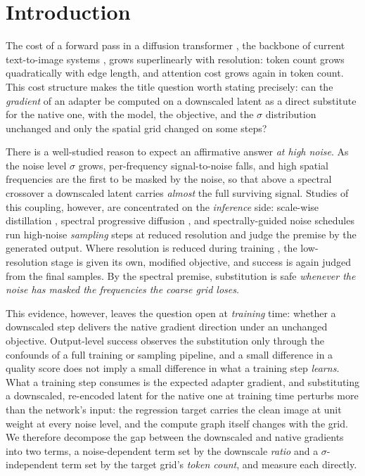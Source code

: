 \section{Introduction}
\label{sec:intro}

The cost of a forward pass in a diffusion transformer
\citep{peebles2023dit}, the backbone of current text-to-image
systems \citep{esser2024scaling,chen2024pixartalpha}, grows
superlinearly with resolution: token count grows quadratically with
edge length, and attention cost grows again in token count. This
cost structure makes the title question worth stating precisely: can
the \emph{gradient} of an adapter be computed on a downscaled latent
as a direct substitute for the native one, with the model, the
objective, and the $\sigma$ distribution unchanged and only
the spatial grid changed on some steps?

There is a well-studied reason to expect an affirmative answer
\emph{at high noise}. As the
noise level $\sigma$ grows, per-frequency signal-to-noise falls, and
high spatial frequencies are the first to be masked by the noise, so
that above a spectral crossover a downscaled latent carries
\emph{almost} the full surviving signal. Studies of this coupling, however, are
concentrated on the \emph{inference} side: scale-wise
distillation \citep{starodubcev2025swd}, spectral progressive
diffusion \citep{xiao2026spd}, and spectrally-guided noise schedules
\citep{esteves2026spectral} run high-noise \emph{sampling} steps at
reduced resolution and judge the premise by the generated output.
Where resolution is reduced during training
\citep{jin2024pyramidal,karras2018progressive,chen2024pixartalpha,hoogeboom2023simple},
the low-resolution stage is given its own, modified objective, and
success is again judged from the final samples. By the spectral
premise, substitution is safe \emph{whenever the noise has masked the
frequencies the coarse grid loses}.

This evidence, however, leaves the question open at \emph{training}
time: whether a downscaled step delivers the native gradient
direction under an unchanged objective. Output-level success observes
the substitution only through the confounds of a full training or
sampling pipeline, and a small difference in a quality score does not
imply a small difference in what a training step \emph{learns}. What
a training step consumes is the expected adapter gradient, and
substituting a downscaled, re-encoded latent for the native one at
training time perturbs more than the network's input: the regression
target carries the clean image at unit weight at every noise level,
and the compute graph itself changes with the grid. We therefore
decompose the gap between the downscaled and native gradients into
two terms, a noise-dependent term set by the downscale \emph{ratio}
and a $\sigma$-independent term set by the target grid's \emph{token
count}, and measure each directly.

